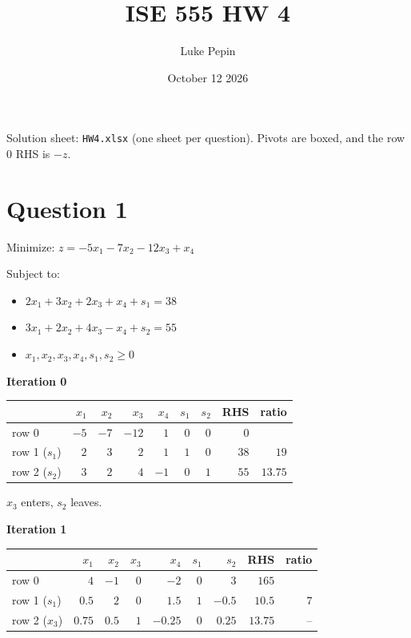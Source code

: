 \documentclass{article}
\title{ISE 555 HW 4}
\author{Luke Pepin}
\date{October 12 2026}
\begin{document}
\maketitle

Solution sheet: \texttt{HW4.xlsx} (one sheet per question). Pivots are boxed, and the row 0 RHS is $-z$.

\section*{Question 1}
Minimize: $z = -5x_1 - 7x_2 - 12x_3 + x_4$

Subject to:
\begin{itemize}
    \item $2x_1 + 3x_2 + 2x_3 + x_4 + s_1 = 38$
    \item $3x_1 + 2x_2 + 4x_3 - x_4 + s_2 = 55$
    \item $x_1, x_2, x_3, x_4, s_1, s_2 \ge 0$
\end{itemize}

\textbf{Iteration 0}

\begin{center}
\begin{tabular}{lrrrrrrrr}
\toprule
 & $x_1$ & $x_2$ & $x_3$ & $x_4$ & $s_1$ & $s_2$ & RHS & ratio \\
\midrule
row 0 & $-5$ & $-7$ & $-12$ & $1$ & $0$ & $0$ & $0$ &  \\
row 1 ($s_1$) & $2$ & $3$ & $2$ & $1$ & $1$ & $0$ & $38$ & $19$ \\
row 2 ($s_2$) & $3$ & $2$ & $\boxed{4}$ & $-1$ & $0$ & $1$ & $55$ & $13.75$ \\
\bottomrule
\end{tabular}
\end{center}

$x_3$ enters, $s_2$ leaves.

\textbf{Iteration 1}

\begin{center}
\begin{tabular}{lrrrrrrrr}
\toprule
 & $x_1$ & $x_2$ & $x_3$ & $x_4$ & $s_1$ & $s_2$ & RHS & ratio \\
\midrule
row 0 & $4$ & $-1$ & $0$ & $-2$ & $0$ & $3$ & $165$ &  \\
row 1 ($s_1$) & $0.5$ & $2$ & $0$ & $\boxed{1.5}$ & $1$ & $-0.5$ & $10.5$ & $7$ \\
row 2 ($x_3$) & $0.75$ & $0.5$ & $1$ & $-0.25$ & $0$ & $0.25$ & $13.75$ & -- \\
\bottomrule
\end{tabular}
\end{center}
\end{document}
